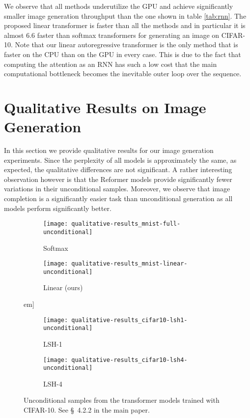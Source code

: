\documentclass{article}
\begin{document}
We observe that all methods underutilize the GPU and achieve significantly
smaller image generation throughput than the one shown in table \ref{tab:rnn}.
The proposed linear transformer is faster than all the methods and in
particular it is almost 6.6 faster than softmax transformers for
generating an image on CIFAR-10. Note that our linear autoregressive
transformer is the only method that is faster on the CPU than on the GPU in
every case. This is due to the fact that computing the attention as an RNN has
such a low cost that the main computational bottleneck becomes the inevitable
outer loop over the sequence.

\section{Qualitative Results on Image Generation}

In this section we provide qualitative results for our image generation
experiments. Since the perplexity of all models is approximately the same, as
expected, the qualitative differences are not significant. A rather interesting
observation however is that the Reformer models provide significantly fewer
variations in their unconditional samples. Moreover, we observe that image
completion is a significantly easier task than unconditional generation as all
models perform significantly better.

\begin{figure*}[h]
    \centering
    \begin{subfigure}[t]{0.4\columnwidth}
        \texttt{[image: qualitative-results\_mnist-full-unconditional]}
        \caption{Softmax}
    \end{subfigure}
    \quad
    \begin{subfigure}[t]{0.4\columnwidth}
        \texttt{[image: qualitative-results\_mnist-linear-unconditional]}
        \caption{Linear (ours)}
    \end{subfigure}\1em]
    \begin{subfigure}[t]{0.4\columnwidth}
        \texttt{[image: qualitative-results\_cifar10-lsh1-unconditional]}
        \caption{LSH-1}
    \end{subfigure}
    \quad
    \begin{subfigure}[t]{0.4\columnwidth}
        \texttt{[image: qualitative-results\_cifar10-lsh4-unconditional]}
        \caption{LSH-4}
    \end{subfigure}
    \caption{Unconditional samples from the transformer models trained with
             CIFAR-10. See \S~{4.2.2} in the main paper.}
    \label{fig:cifar_unconditional}
\end{figure*}
\end{document}
